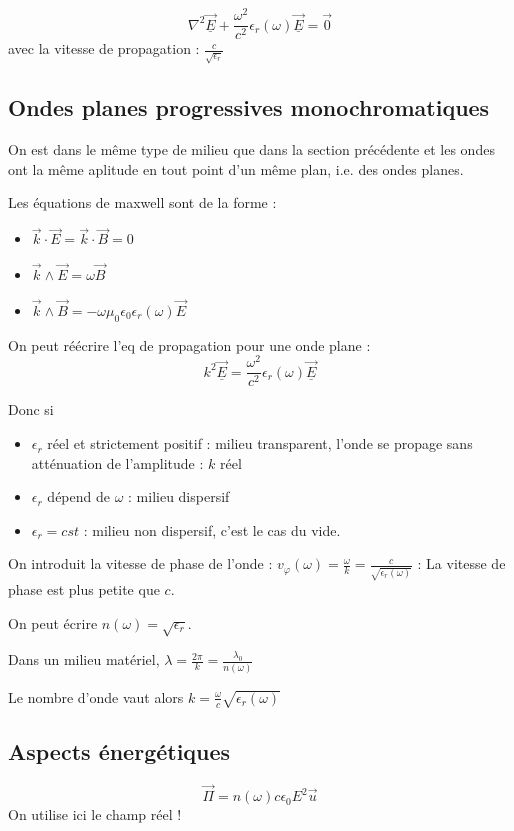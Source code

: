 \documentclass[french]{yLectureNote}
\renewcommand{\vec}{\overrightarrow}
\newcommand{\lap}{\nabla^2}
\begin{document}
$$\lap \vec{\underline{E}}+\frac{\omega^2}{c^2}\epsilon_r(\omega)\vec{\underline{E}}=\vec{0}$$
avec la vitesse de propagation : $\frac{c}{\sqrt{\epsilon_r}}$
\subsection{Ondes planes progressives monochromatiques}
On est dans le même type de milieu que dans la section précédente et les ondes ont la même aplitude en tout point d'un même plan, i.e. des ondes planes.

Les équations de maxwell sont de la forme :
\begin{itemize}
    \item $\vec{k}\cdot \vec{E} = \vec{k}\cdot \vec{B} = 0$
    \item $\vec{k}\wedge \vec{E} = \omega \vec{B}$
    \item $\vec{k}\wedge \vec{B} = -\omega \mu_0\epsilon_0\epsilon_r(\omega)\vec{E}$
\end{itemize}
 On peut réécrire l'eq de propagation pour une onde plane :
 $$k^2 \vec{\underline{E}} = \frac{\omega^2}{c^2}\epsilon_r(\omega)\vec{\underline{E}}$$
 
 Donc si 
 \begin{itemize}
    \item $\epsilon_r$ réel et strictement positif : milieu transparent, l'onde se propage sans atténuation de l'amplitude : $k$ réel
    \item $\epsilon_r$ dépend de $\omega$ : milieu dispersif
    \item $\epsilon_r =cst$ : milieu non dispersif, c'est le cas du vide.
 \end{itemize}
On introduit la vitesse de phase de l'onde :
$v_{\varphi}(\omega) = \frac{\omega}{k} = \frac{c}{\sqrt{\epsilon_r(\omega)}}$ : La vitesse de phase est plus petite que $c$.

On peut écrire $n(\omega) = \sqrt{\epsilon_r}$.

Dans un milieu matériel, $\lambda = \frac{2\pi}{k} = \frac{\lambda_0}{n(\omega)}$

Le nombre d'onde vaut alors $ k = \frac{\omega}{c}\sqrt{\epsilon_r(\omega)}$
\subsection{Aspects énergétiques}
$$\vec{\Pi} = n(\omega)c\epsilon_0E^2\vec{u}$$
On utilise ici le champ réel !

\end{document}
